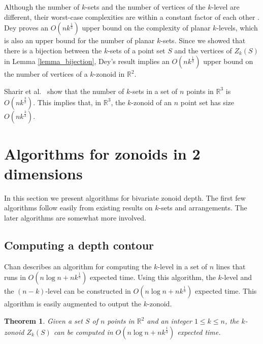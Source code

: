 \documentclass{elsart}
\newtheorem{theorem}{Theorem}
\begin{document}
Although the number of $k$-sets and the number of vertices of the
$k$-level are different, their worst-case complexities are within a
constant factor of each other \cite{edelsbrunner_book}. Dey
\cite{improved_bounds_on_planar_ksets_and_klevels} proves an
$O(nk^{\frac{1}{3}})$ upper bound on the complexity of planar
$k$-levels, which is also an upper bound for the number of planar
$k$-sets. Since we showed that there is a bijection between the
$k$-sets of a point set $S$ and the vertices of $Z_k(S)$ in Lemma
\ref{lemma_bijection}, Dey's result implies an $O(nk^{\frac{1}{3}})$
upper bound on the number of vertices of a $k$-zonoid in
$\mathbb{R}^2$.

Sharir et al.\ \cite{an_improved_bound_for_ksets_in_three_dimensions}
show that the number of $k$-sets in a set of $n$ points in
$\mathbb{R}^3$ is $O(nk^{\frac{3}{2}})$. This implies that, in
$\mathbb{R}^3$, the $k$-zonoid of an $n$ point set has size
$O(nk^{\frac{3}{2}})$.

\section{Algorithms for zonoids in 2 dimensions}
\label{section_algorithms_for_zonoids_in_2_dimensions}

In this section we present algorithms for bivariate zonoid depth. The
first few algorithms follow easily from existing results on $k$-sets
and arrangements. The later algorithms are somewhat more involved.

\subsection{Computing a depth contour}
\label{subsection_computing_a_depth_countour}

Chan \cite{remarks_on_klevel_algorithms_in_the_plane} describes an
algorithm for computing the $k$-level in a set of $n$ lines that runs
in $O(n \log n + nk^{\frac{1}{3}})$ expected time. Using this
algorithm, the $k$-level and the $(n-k)$-level can be constructed in
$O(n \log n + nk^{\frac{1}{3}})$ expected time. This algorithm is
easily augmented to output the $k$-zonoid. 

\begin{theorem}\label{theorem_build_k_zonoid}
Given a set $S$ of $n$ points in $\mathbb{R}^2$ and an integer $1 \le
k \le n$, the $k$-zonoid $Z_k(S)$ can be computed in $O(n \log n +
nk^{\frac{1}{3}})$ expected time.
\end{theorem}
\end{document}
